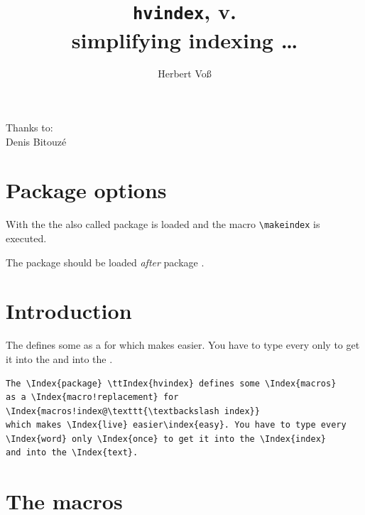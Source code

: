\documentclass[english]{article}
\title{\texttt{hvindex}, v. \fileversion\\ simplifying indexing \ldots}
\author{Herbert Voß}
\date{\filedate}
\begin{document}
\maketitle

\tableofcontents

\vfill
Thanks to:\\
Denis Bitouzé

\clearpage
\section{Package options}
With the   the also called package is 
loaded and the macro \texttt{\textbackslash{}makeindex}
is executed.

The package should be loaded \emph{after} package .

\section{Introduction}
The   defines some 
as a  for 
which makes  easier. You have to type every
 only  to get it into the  
and into the .


\small
\begin{verbatim}
The \Index{package} \ttIndex{hvindex} defines some \Index{macros}
as a \Index{macro!replacement} for 
\Index{macros!index@\texttt{\textbackslash index}} 
which makes \Index{live} easier\index{easy}. You have to type every
\Index{word} only \Index{once} to get it into the \Index{index} 
and into the \Index{text}.
\end{verbatim}
\normalsize


\clearpage
\section{The macros}
\end{document}
